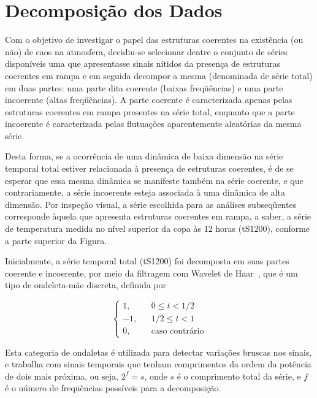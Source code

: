 \section{Decomposição dos Dados}

Com o objetivo de investigar o papel das estruturas coerentes na existência (ou não) de caos na atmosfera, decidiu-se selecionar dentre o conjunto de séries disponíveis uma que apresentasse sinais nítidos da presença de estruturas coerentes em rampa e em seguida decompor a mesma (denominada de série total) em duas partes: uma parte dita coerente (baixas freqüências) e uma parte incoerente (altas freqüências). A parte coerente é caracterizada apenas pelas estruturas coerentes em rampa presentes na série total, enquanto que a parte incoerente é caracterizada pelas flutuações aparentemente aleatórias da mesma série. 

Desta forma, se a ocorrência de uma dinâmica de baixa dimensão na série temporal total estiver relacionada à presença de estruturas coerentes, é de se esperar que essa mesma dinâmica se manifeste também na série coerente, e que contrariamente, a série incoerente esteja associada à uma dinâmica de alta dimensão. Por inspeção visual, a série escolhida para as análises subseqüentes corresponde àquela que apresenta estruturas coerentes em rampa, a saber, a série de temperatura medida no nível superior da copa às 12 horas (tS1200), conforme a parte superior da Figura. 


Inicialmente, a série temporal total (tS1200) foi decomposta em suas partes coerente e incoerente, por meio da filtragem com Wavelet de Haar~\cite{katul/94}, que é um tipo de ondeleta-mãe discreta, definida por

\begin{equation}
\left\{ \begin{array}{rrr} 1, &  & 0\leq t < 1/2 \\
                  -1, &  & 1/2\leq t < 1 \\
		   0, &  & \mbox{caso contrário}
\end{array} 
\right.
\label{eqwavelethaar}
\end{equation} 

Esta categoria de ondaletas é utilizada para detectar variações bruscas nos sinais, e trabalha com sinais temporais que tenham comprimentos da ordem da potência de dois mais próxima, ou seja, $2^{f}=s$, onde $s$ é o comprimento total da série, e $f$ é o número de freqüências possíveis para a decomposição. 

